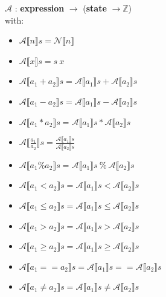 \documentclass{article}
\begin{document}
\begin{enumerate}
        $\mathscr{A}$ : \textbf{expression} $\rightarrow$ (\textbf{state} $\rightarrow \mathbb{Z}$)\\
        with:
        \begin{itemize}
            \item $\mathscr{A}\llbracket n\rrbracket s = \mathscr{N}\llbracket n\rrbracket$
            \item $\mathscr{A}\llbracket x\rrbracket s = s \: x$
            \item $\mathscr{A}\llbracket a_1 + a_2\rrbracket s = \mathscr{A}\llbracket a_1\rrbracket s + \mathscr{A}\llbracket a_2\rrbracket s$
            \item $\mathscr{A}\llbracket a_1 - a_2\rrbracket s = \mathscr{A}\llbracket a_1\rrbracket s - \mathscr{A}\llbracket a_2\rrbracket s$
            \item $\mathscr{A}\llbracket a_1 * a_2\rrbracket s = \mathscr{A}\llbracket a_1\rrbracket s * \mathscr{A}\llbracket a_2\rrbracket s$
            \item $\mathscr{A}\llbracket \frac{a_1}{a_2}\rrbracket s = \frac{\mathscr{A}\llbracket a_1\rrbracket s}{\mathscr{A}\llbracket a_2\rrbracket s}$
            \item $\mathscr{A}\llbracket a_1 \% a_2\rrbracket s = \mathscr{A}\llbracket a_1\rrbracket s \: \% \: \mathscr{A}\llbracket a_2\rrbracket s$
            \item $\mathscr{A}\llbracket a_1 < a_2\rrbracket s = \mathscr{A}\llbracket a_1\rrbracket s < \mathscr{A}\llbracket a_2\rrbracket s$
            \item $\mathscr{A}\llbracket a_1 \leq a_2\rrbracket s = \mathscr{A}\llbracket a_1\rrbracket s \leq \mathscr{A}\llbracket a_2\rrbracket s$
            \item $\mathscr{A}\llbracket a_1 > a_2\rrbracket s = \mathscr{A}\llbracket a_1\rrbracket s > \mathscr{A}\llbracket a_2\rrbracket s$
            \item $\mathscr{A}\llbracket a_1 \geq a_2\rrbracket s = \mathscr{A}\llbracket a_1\rrbracket s \geq \mathscr{A}\llbracket a_2\rrbracket s$
            \item $\mathscr{A}\llbracket a_1 == a_2\rrbracket s = \mathscr{A}\llbracket a_1\rrbracket s == \mathscr{A}\llbracket a_2\rrbracket s$
            \item $\mathscr{A}\llbracket a_1 \neq a_2\rrbracket s = \mathscr{A}\llbracket a_1\rrbracket s \neq \mathscr{A}\llbracket a_2\rrbracket s$
            

\end{itemize}
\end{enumerate}
\end{document}
